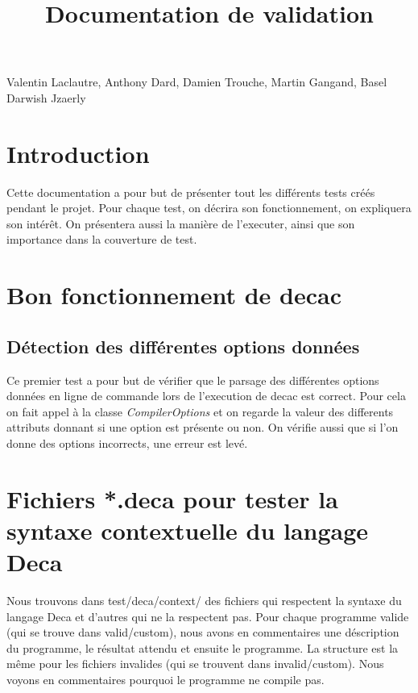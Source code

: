 \documentclass[12pt, a4paper, one side]{article}
\title{Documentation de validation}
\author{}
\date{}
\begin{document}
\maketitle

\begin{center}
    Valentin Laclautre, Anthony Dard, Damien Trouche, Martin Gangand, Basel Darwish Jzaerly
\end{center}

\tableofcontents

\newpage

\section{Introduction}

Cette documentation a pour but de présenter tout les différents tests créés pendant le projet.
Pour chaque test, on décrira son fonctionnement, on expliquera son intérêt. On présentera aussi
la manière de l'executer, ainsi que son importance dans la couverture de test.

\section{Bon fonctionnement de decac}

\subsection{Détection des différentes options données}

Ce premier test a pour but de vérifier que le parsage des différentes options données en ligne
de commande lors de l'execution de decac est correct. Pour cela on fait appel à la classe \textit{CompilerOptions}
et on regarde la valeur des differents attributs donnant si une option est présente ou non. On vérifie aussi que si l'on
donne des options incorrects, une erreur est levé.

\section{Fichiers *.deca pour tester la syntaxe contextuelle du langage Deca}
Nous trouvons dans test/deca/context/ des fichiers qui respectent la syntaxe du langage Deca et d'autres qui ne la respectent pas.
Pour chaque programme valide (qui se trouve dans valid/custom), nous avons en commentaires une déscription du programme,
le résultat attendu et ensuite le programme.
La structure est la même pour les fichiers invalides (qui se trouvent dans invalid/custom). Nous voyons en commentaires pourquoi le programme ne compile pas.
\end{document}
